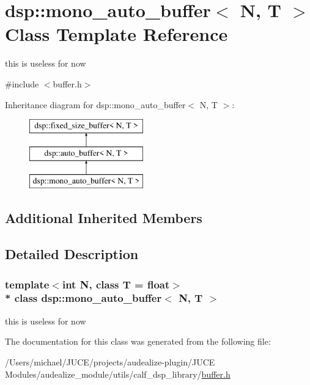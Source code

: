 \hypertarget{classdsp_1_1mono__auto__buffer}{}\section{dsp\+:\+:mono\+\_\+auto\+\_\+buffer$<$ N, T $>$ Class Template Reference}
\label{classdsp_1_1mono__auto__buffer}


this is useless for now  




{\ttfamily \#include $<$buffer.\+h$>$}

Inheritance diagram for dsp\+:\+:mono\+\_\+auto\+\_\+buffer$<$ N, T $>$\+:\begin{figure}[H]
\begin{center}
\leavevmode
\includegraphics[height=3.000000cm]{classdsp_1_1mono__auto__buffer}
\end{center}
\end{figure}
\subsection*{Additional Inherited Members}


\subsection{Detailed Description}
\subsubsection*{template$<$int N, class T = float$>$\\*
class dsp\+::mono\+\_\+auto\+\_\+buffer$<$ N, T $>$}

this is useless for now 

The documentation for this class was generated from the following file\+:\begin{DoxyCompactItemize}
\item 
/\+Users/michael/\+J\+U\+C\+E/projects/audealize-\/plugin/\+J\+U\+C\+E Modules/audealize\+\_\+module/utils/calf\+\_\+dsp\+\_\+library/\hyperlink{buffer_8h}{buffer.\+h}\end{DoxyCompactItemize}
